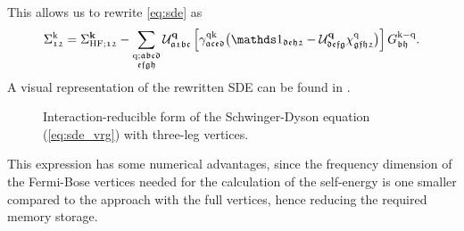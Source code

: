 \documentclass[../../main.tex]{subfiles}
\begin{document}
This allows us to rewrite \eqref{eq:sde} as
\begin{align}\label{eq:sde_vrg}
	\Sigma_{\mathfrak{12}}^{\k}=\Sigma_{\text{HF};\mathfrak{12}}^{\vv{k}}-\sum_{\substack{\q;\mathfrak{abcd}\\\mathfrak{efgh}}}\mathcal{U}^{\vv{q}}_{\mathfrak{a1bc}}\left [\gamma_{\mathfrak{aced}}^{\q\k}\big (\unity_{\mathfrak{deh2}}-\mathcal{U}^{\vv{q}}_{\mathfrak{defg}}\chi_{\mathfrak{gfh2}}^{\q}\big)\right ]G_{\mathfrak{bh}}^{\k-\q}.
\end{align}
A visual representation of the rewritten SDE can be found in . 
\begin{figure}[ht!]
	\centering
  	
  	\caption{Interaction-reducible form of the Schwinger-Dyson equation (\ref{eq:sde_vrg}) with three-leg vertices.}
  	\label{fig:sde_vrg}
\end{figure}
This expression has some numerical advantages, since the frequency dimension of the Fermi-Bose vertices needed for the calculation of the self-energy is one smaller compared to the approach with the full vertices, hence reducing the required memory storage. 
\\\\
\end{document}
